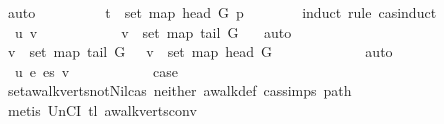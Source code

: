 \begin{isabellebody}
\ auto\isanewline
\ \ \ \ \ \ \isamarkupfalse%
\ \isamarkupfalse%
\ {\isachardoublequoteopen}t\ {\isasymin}\ set\ {\isacharparenleft}{\kern0pt}map\ {\isacharparenleft}{\kern0pt}head\ G{\isacharparenright}{\kern0pt}\ p{\isacharparenright}{\kern0pt}{\isachardoublequoteclose}\isanewline
\ \ \ \ \ \ \isamarkupfalse%
\ {\isacharparenleft}{\kern0pt}induct\ rule{\isacharcolon}{\kern0pt}\ cas{\isachardot}{\kern0pt}induct{\isacharparenright}{\kern0pt}\isanewline
\ \ \ \ \ \ \ \ \isamarkupfalse%
\ {\isacharparenleft}{\kern0pt}{}\ u\ v{\isacharparenright}{\kern0pt}\isanewline
\ \ \ \ \ \ \ \ \isamarkupfalse%
\ \isamarkupfalse%
\ {\isachardoublequoteopen}v\ {\isasymnotin}\ set\ {\isacharparenleft}{\kern0pt}map\ {\isacharparenleft}{\kern0pt}tail\ G{\isacharparenright}{\kern0pt}\ {\isacharbrackleft}{\kern0pt}{\isacharbrackright}{\kern0pt}{\isacharparenright}{\kern0pt}{\isachardoublequoteclose}\ \isamarkupfalse%
\ auto\isanewline
\ \ \ \ \ \ \ \ \isamarkupfalse%
\ \isamarkupfalse%
\ {\isachardoublequoteopen}v\ {\isasymin}\ set\ {\isacharparenleft}{\kern0pt}map\ {\isacharparenleft}{\kern0pt}tail\ G{\isacharparenright}{\kern0pt}\ {\isacharbrackleft}{\kern0pt}{\isacharbrackright}{\kern0pt}{\isacharparenright}{\kern0pt}\ {\isasymLongrightarrow}\ v\ {\isasymin}\ set\ {\isacharparenleft}{\kern0pt}map\ {\isacharparenleft}{\kern0pt}head\ G{\isacharparenright}{\kern0pt}\ {\isacharbrackleft}{\kern0pt}{\isacharbrackright}{\kern0pt}{\isacharparenright}{\kern0pt}{\isachardoublequoteclose}\isanewline
\ \ \ \ \ \ \ \ \ \ \isamarkupfalse%
\ auto\isanewline
\ \ \ \ \ \ \isamarkupfalse%
\isanewline
\ \ \ \ \ \ \ \ \isamarkupfalse%
\ {\isacharparenleft}{\kern0pt}{}\ u\ e\ es\ v{\isacharparenright}{\kern0pt}\isanewline
\ \ \ \ \ \ \ \ \isamarkupfalse%
\ \isamarkupfalse%
\ {\isacharquery}{\kern0pt}case\isanewline
\ \ \ \ \ \ \ \ \ \ \isamarkupfalse%
\ set{\isacharunderscore}{\kern0pt}awalk{\isacharunderscore}{\kern0pt}verts{\isacharunderscore}{\kern0pt}not{\isacharunderscore}{\kern0pt}Nil{\isacharunderscore}{\kern0pt}cas\ neither\ awalk{\isacharunderscore}{\kern0pt}def\ cas{\isachardot}{\kern0pt}simps{\isacharparenleft}{\kern0pt}{}{\isacharparenright}{\kern0pt}\ path\isanewline
\ \ \ \ \ \ \ \ \ \ \isamarkupfalse%
\ {\isacharparenleft}{\kern0pt}metis\ UnCI\ tl{}\ awalk{\isacharunderscore}{\kern0pt}verts{\isacharunderscore}{\kern0pt}conv{\isacharprime}{\kern0pt}\isanewline

\end{isabellebody}
